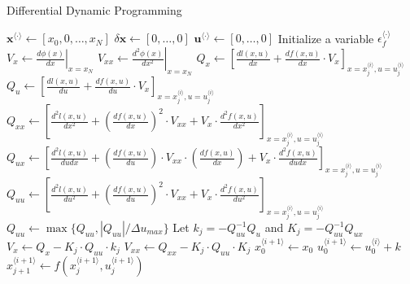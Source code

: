 \documentclass{article}
\begin{document}
\begin{algorithm}[t]
\caption{Differential Dynamic Programming}\label{DDP}
\renewcommand{\algorithmicrequire}{\textbf{Input:}}
\begin{algorithmic}[1]
\State $\mathbf{x}^{\langle \cdot \rangle}\leftarrow [x_0,0,\ldots,x_N]$
\State $\delta\mathbf{x}\leftarrow [0,\ldots,0]$
\State $\mathbf{u}^{\langle \cdot \rangle}\leftarrow [0,\ldots,0]$
\State Initialize a variable $\epsilon_f^{\langle \cdot \rangle}$
\textcolor{gray}{}
\State $V_x \leftarrow \left.\frac{d\phi(x)}{dx}\right|_{x=x_N}$
\State $V_{xx} \leftarrow \left.\frac{d^2\phi(x)}{dx^2}\right|_{x=x_N}$
 \textcolor{gray}{}
\State $Q_x \leftarrow \left[\frac{dl(x,u)}{dx}+\frac{df(x,u)}{dx}\cdot V_x\right]_{x=x_j^{\langle i \rangle},u=u_j^{\langle i \rangle}}$
\State $Q_u \leftarrow \left[\frac{dl(x,u)}{du}+\frac{df(x,u)}{du}\cdot V_x\right]_{x=x_j^{\langle i \rangle},u=u_j^{\langle i \rangle}}$
\State $Q_{xx} \leftarrow \left[\frac{d^2l(x,u)}{dx^2}+\left(\frac{df(x,u)}{dx}\right)^2\cdot V_{xx} + V_x \cdot \frac{d^2f(x,u)}{dx^2}\right]_{x=x_j^{\langle i \rangle},u=u_j^{\langle i \rangle}}$
\State $Q_{ux} \leftarrow \left[\frac{d^2l(x,u)}{dudx}+\left(\frac{df(x,u)}{du}\right)\cdot V_{xx} \cdot \left(\frac{df(x,u)}{dx}\right) + V_x \cdot \frac{d^2f(x,u)}{dudx}\right]_{x=x_j^{\langle i \rangle},u=u_j^{\langle i \rangle}}$
\State $Q_{uu} \leftarrow \left[\frac{d^2l(x,u)}{du^2}+\left(\frac{df(x,u)}{du}\right)^2\cdot V_{xx} + V_x \cdot \frac{d^2f(x,u)}{du^2}\right]_{x=x_j^{\langle i \rangle},u=u_j^{\langle i \rangle}}$
\State $Q_{uu} \leftarrow \max\{Q_{uu},|Q_{uu}|/\Delta u_{max}\}$
\EndIf
\State Let $k_j=-Q_{uu}^{-1}Q_{u}$ and $K_j=-Q_{uu}^{-1}Q_{ux}$
\State $V_x \leftarrow Q_x-K_j\cdot Q_{uu}\cdot k_j$\textcolor{gray}{}
\State $V_{xx} \leftarrow Q_{xx}-K_j\cdot Q_{uu}\cdot K_j$
\EndFor
\State $x_0^{\langle i+1 \rangle} \leftarrow x_0$
\State $u_0^{\langle i+1 \rangle} \leftarrow u_0^{\langle i \rangle} + k$
\textcolor{gray}{}
\textcolor{gray}{}
\State $x_{j+1}^{\langle i+1 \rangle} \leftarrow f(x_j^{\langle i+1 \rangle},u_j^{\langle i+1 \rangle})$

\end{algorithmic}
\end{algorithm}
\end{document}
